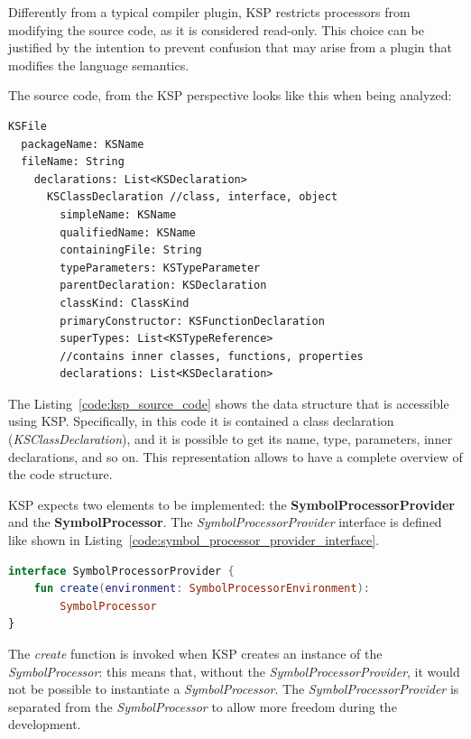Differently from a typical compiler plugin, KSP restricts processors from modifying the source code, as it is considered read-only. This choice can be justified by the intention to prevent confusion that may arise from a plugin that modifies the language semantics.

The source code, from the KSP perspective looks like this when being analyzed:
\begin{lstlisting}[caption={The source code from KSP perspective}, captionpos=b, label={code:ksp_source_code}]
KSFile
  packageName: KSName
  fileName: String
    declarations: List<KSDeclaration>
      KSClassDeclaration //class, interface, object
        simpleName: KSName
        qualifiedName: KSName
        containingFile: String
        typeParameters: KSTypeParameter
        parentDeclaration: KSDeclaration
        classKind: ClassKind
        primaryConstructor: KSFunctionDeclaration
        superTypes: List<KSTypeReference>
        //contains inner classes, functions, properties
        declarations: List<KSDeclaration>    
\end{lstlisting}
The Listing~\ref{code:ksp_source_code} shows the data structure that is accessible using KSP. Specifically, in this code it is contained a class declaration (\textit{KSClassDeclaration}), and it is possible to get its name, type, parameters, inner declarations, and so on.\newline
This representation allows to have a complete overview of the code structure.

KSP expects two elements to be implemented: the \textbf{SymbolProcessorProvider} and the \textbf{SymbolProcessor}.\newline
The \textit{SymbolProcessorProvider} interface is defined like shown in Listing~\ref{code:symbol_processor_provider_interface}.
\begin{lstlisting}[caption={SymbolProcessorProvider interface}, language=Kotlin, captionpos=b, label={code:symbol_processor_provider_interface}]
interface SymbolProcessorProvider {
    fun create(environment: SymbolProcessorEnvironment):
        SymbolProcessor
}
\end{lstlisting}
The \textit{create} function is invoked when KSP creates an instance of the \textit{SymbolProcessor}: this means that, without the \textit{SymbolProcessorProvider}, it would not be possible to instantiate a \textit{SymbolProcessor}. The \textit{SymbolProcessorProvider} is separated from the \textit{SymbolProcessor} to allow more freedom during the development.

